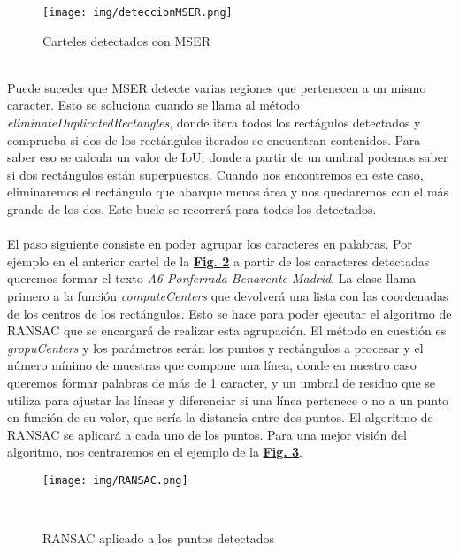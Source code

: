 \documentclass[a4paper, 12pt]{article}
\begin{document}
\begin{figure}[h]
	\centering
	\texttt{[image: img/deteccionMSER.png]}
 	\caption{Carteles detectados con MSER}\vspace{0.5cm}
	\label{fig:normalizacion}
\end{figure}
\\Puede suceder que MSER detecte varias regiones que pertenecen a un mismo caracter. Esto se soluciona cuando se llama al método \textit{eliminateDuplicatedRectangles}, donde itera todos los rectágulos detectados y comprueba si dos de los rectángulos iterados se encuentran contenidos. Para saber eso se calcula un valor de IoU, donde a partir de un umbral podemos saber si dos rectángulos están superpuestos. Cuando nos encontremos en este caso, eliminaremos el rectángulo que abarque menos área y nos quedaremos con el más grande de los dos. Este bucle se recorrerá para todos los detectados.
\\\\
El paso siguiente consiste en poder agrupar los caracteres en palabras. Por ejemplo en el anterior cartel de la \textbf{\hyperref[fig:normalizacion]{Fig. 2}} a partir de los caracteres detectadas queremos formar el texto \textit{A6 Ponferrada Benavente Madrid}. La clase llama primero a la función \textit{computeCenters} que devolverá una lista con las coordenadas de los centros de los rectángulos. Esto se hace para poder ejecutar el algoritmo de RANSAC que se encargará de realizar esta agrupación. El método en cuestión es \textit{gropuCenters} y los parámetros serán los puntos y rectángulos a procesar y el número mínimo de muestras que compone una línea, donde en nuestro caso queremos formar palabras de más de 1 caracter, y un umbral de residuo que se utiliza para ajustar las líneas y diferenciar si una línea pertenece o no a un punto en función de su valor, que sería la distancia entre dos puntos. El algoritmo de RANSAC se aplicará a cada uno de los puntos. Para una mejor visión del algoritmo, nos centraremos en el ejemplo de la \textbf{\hyperref[fig:normalizacion]{Fig. 3}}.
\begin{figure}[h]
	\centering
	\texttt{[image: img/RANSAC.png]}
 	\caption{RANSAC aplicado a los puntos detectados}\
	\label{fig:normalizacion}
\end{figure}
\end{document}
